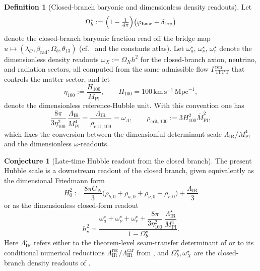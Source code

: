 \documentclass[11pt,a4paper]{article}
\theoremstyle{definition}
\newtheorem{definition}[theorem]{Definition}
\newtheorem{conjecture}[theorem]{Conjecture}
\theoremstyle{remark}
\newcommand{\Mpl}{\bar M_{\mathrm{Pl}}}
\newcommand{\Mplunred}{M_{\mathrm{Pl}}}
\newcommand{\phibase}{\varphi_{\mathrm{base}}}
\newcommand{\deltatop}{\delta_{\mathrm{top}}}
\begin{document}
\begin{definition}[Closed-branch baryonic and dimensionless density readouts]
\label{def:closed-branch-density-readouts}
Let
\[
\Omega_b^\star
:=
\Bigl(1-\tfrac{1}{4\pi}\Bigr)\bigl(\phibase+\deltatop\bigr)
\]
denote the closed-branch baryonic fraction read off the bridge map
$u\mapsto(\lambda_C,\beta_{\mathrm{rad}},\Omega_b,\theta_{13})$ (cf.\ 
and the constants atlas). Let $\omega_a^\star$, $\omega_\nu^\star$, $\omega_r^\star$ denote the
dimensionless density readouts $\omega_X:=\Omega_X h^2$ for the closed-branch axion, neutrino, and
radiation sectors, all computed from the same admissible flow $\Gamma_{\mathrm{TFPT}}^{\mathrm{ren}}$
that controls the matter sector, and let
\[
\eta_{100}
:=
\frac{H_{100}}{\Mplunred},
\qquad
H_{100}=100\,\mathrm{km}\,\mathrm{s}^{-1}\,\mathrm{Mpc}^{-1},
\]
denote the dimensionless reference-Hubble unit. With this convention one has
\[
\frac{8\pi}{3\eta_{100}^2}\,\frac{\Lambda_{\mathrm{IR}}}{\Mplunred^4}
=
\frac{\Lambda_{\mathrm{IR}}}{\rho_{\mathrm{crit},100}}
=
\omega_\Lambda,
\qquad
\rho_{\mathrm{crit},100}:=3H_{100}^2\Mpl^2,
\]
which fixes the conversion between the dimensionful determinant scale
$\Lambda_{\mathrm{IR}}/\Mplunred^4$ and the dimensionless $\omega$-readouts.
\end{definition}

\begin{conjecture}[Late-time Hubble readout from the closed branch]
\label{cor:late_time_hubble_readout}
The present Hubble scale is a downstream readout of the closed branch, given equivalently as the
dimensional Friedmann form
\[
H_0^2
:=
\frac{8\pi G_N}{3}\bigl(\rho_{b,0}+\rho_{a,0}+\rho_{\nu,0}+\rho_{r,0}\bigr)
+\frac{\Lambda_{\mathrm{IR}}}{3}
\]
or as the dimensionless closed-form readout
\[
\boxed{\;
h_\star^2
=
\frac{
\omega_a^\star+\omega_\nu^\star+\omega_r^\star
+\dfrac{8\pi}{3\eta_{100}^2}\,\dfrac{\Lambda_{\mathrm{IR}}^\star}{\Mplunred^4}
}{
1-\Omega_b^\star
}.\;}
\]
Here $\Lambda_{\mathrm{IR}}^\star$ refers either to the theorem-level seam-transfer determinant of
 or to its conditional numerical reductions
$\Lambda_{\mathrm{IR}}^{\mathrm{rec}}/\Lambda_{\mathrm{IR}}^{\mathrm{car}}$ from
, and $\Omega_b^\star,\omega_X^\star$ are the closed-branch
density readouts of .
\end{conjecture}
\end{document}
